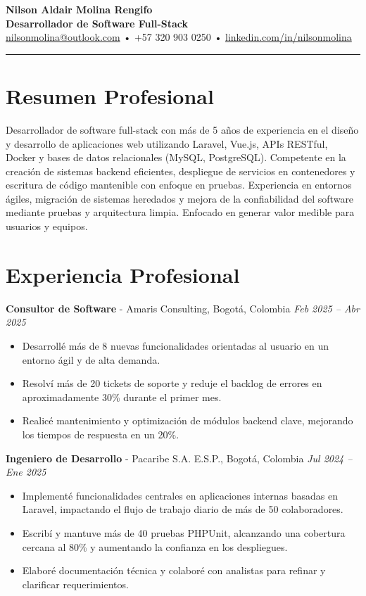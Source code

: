 \documentclass[10.5pt,letterpaper]{article}
\begin{document}
	
	\begin{center}
		{\LARGE \textbf{Nilson Aldair Molina Rengifo}}\\[4pt]
		\textbf{Desarrollador de Software Full-Stack}\\[6pt]
		\href{mailto:nilsonmolina@outlook.com}{nilsonmolina@outlook.com} • +57 320 903 0250 • 
		\href{https://linkedin.com/in/nilsonmolina}{linkedin.com/in/nilsonmolina}
	\end{center}
	
	\hrule
	\vspace{0.5em}
	
	\section*{Resumen Profesional}
	Desarrollador de software full-stack con más de 5 años de experiencia en el diseño y desarrollo de aplicaciones web utilizando Laravel, Vue.js, APIs RESTful, Docker y bases de datos relacionales (MySQL, PostgreSQL). Competente en la creación de sistemas backend eficientes, despliegue de servicios en contenedores y escritura de código mantenible con enfoque en pruebas. Experiencia en entornos ágiles, migración de sistemas heredados y mejora de la confiabilidad del software mediante pruebas y arquitectura limpia. Enfocado en generar valor medible para usuarios y equipos.
	
	\section*{Experiencia Profesional}
	
	\textbf{Consultor de Software} - Amaris Consulting, Bogotá, Colombia
	\hfill
	\textit{Feb 2025 – Abr 2025}
	\begin{itemize}
		\item Desarrollé más de 8 nuevas funcionalidades orientadas al usuario en un entorno ágil y de alta demanda.
		\item Resolví más de 20 tickets de soporte y reduje el backlog de errores en aproximadamente 30\% durante el primer mes.
		\item Realicé mantenimiento y optimización de módulos backend clave, mejorando los tiempos de respuesta en un 20\%.
	\end{itemize}
	
	\textbf{Ingeniero de Desarrollo} - Pacaribe S.A. E.S.P., Bogotá, Colombia
	\hfill
	\textit{Jul 2024 – Ene 2025}
	\begin{itemize}
		\item Implementé funcionalidades centrales en aplicaciones internas basadas en Laravel, impactando el flujo de trabajo diario de más de 50 colaboradores.
		\item Escribí y mantuve más de 40 pruebas PHPUnit, alcanzando una cobertura cercana al 80\% y aumentando la confianza en los despliegues.
		\item Elaboré documentación técnica y colaboré con analistas para refinar y clarificar requerimientos.
	\end{itemize}
	
\end{document}
